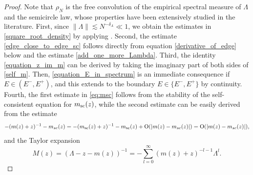 \documentclass[10pt,reqno]{amsart}
\numberwithin{equation}{section}
\numberwithin{figure}{section}
\theoremstyle{plain} %
\theoremstyle{definition} %
\renewcommand{\txt}[1]{\text{\rm{#1}}}
\newcommand{\pa}[1]{\left({#1}\right)}
\newcommand{\norm}[1]{\lVert #1 \rVert}
\newcommand{\avga}[1]{\left\langle #1 \right\rangle}
\newcommand{\OO}{\mathrm{O}}
\numberwithin{equation}{section}
\begin{document}
\begin{proof}
Note that $\rho_N$ is the free convolution of the empirical spectral measure of $\Lambda$ and the semicircle law, whose properties have been extensively studied in the literature. 
First, since $\norm{\Lambda}\lesssim N^{-\delta_A}\ll 1$, we obtain the estimates in \eqref{square_root_density} by applying \cite[Lemma 4.3]{lee2015edge}. 
Second, the estimate  \eqref{edge_close_to_edge_sc} follows directly from equation \eqref{derivative_of_edge} below and the estimate \eqref{add_one_more_Lambda}. 
Third, the identity \eqref{equation_z_im_m} can be derived by taking the imaginary part of both sides of \eqref{self_m}. Then,  \eqref{equation_E_in_spectrum} is an immediate consequence if $E\in \pa{E^-,E^+}$, and this extends to the boundary $E\in \{E^-,E^+\}$ by continuity. Fourth, the first estimate in \eqref{eq:msc} follows from the stability of the self-consistent equation for $m_{\txt{sc}}(z)$, while the second estimate can be easily derived from the estimate %
\[-(m(z)+z)^{-1}-m_{sc}(z)=-(m_{\txt{sc}}(z)+z)^{-1}-m_{\txt{sc}}(z)+\OO(|m(z)-m_{sc}(z)|)=\OO(|m(z)-m_{sc}(z)|),\]
and the Taylor expansion
    \begin{equation}\label{taylor_expansion_M}
        M (z) =\pa{\Lambda-z-m (z) }^{-1}=-\sum_{l=0}^{\infty} \pa{m (z) +z}^{-l-1}\Lambda^l.
    \end{equation}



\end{proof}
\end{document}
